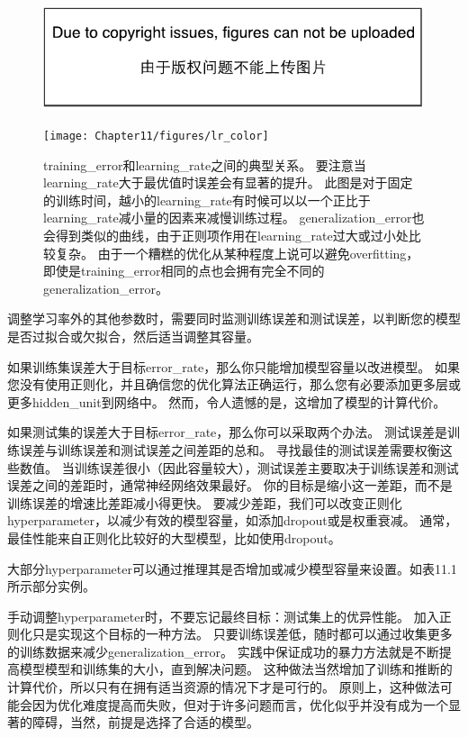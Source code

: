 \begin{figure}[!htb]
\ifOpenSource
\centerline{\includegraphics{figure.pdf}}
\else
\centerline{\texttt{[image: Chapter11/figures/lr\_color]}}
\fi
\caption{\gls{training_error}和\gls{learning_rate}之间的典型关系。
要注意当\gls{learning_rate}大于最优值时误差会有显著的提升。
此图是对于固定的训练时间，越小的\gls{learning_rate}有时候可以以一个正比于\gls{learning_rate}减小量的因素来减慢训练过程。
\gls{generalization_error}也会得到类似的曲线，由于正则项作用在\gls{learning_rate}过大或过小处比较复杂。
由于一个糟糕的优化从某种程度上说可以避免\gls{overfitting}，即使是\gls{training_error}相同的点也会拥有完全不同的\gls{generalization_error}。}
\label{fig:chap11_lr}
\end{figure}

调整学习率外的其他参数时，需要同时监测训练误差和测试误差，以判断您的模型是否过拟合或欠拟合，然后适当调整其容量。

如果训练集误差大于目标\gls{error_rate}，那么你只能增加模型容量以改进模型。
如果您没有使用正则化，并且确信您的优化算法正确运行，那么您有必要添加更多层或更多\gls{hidden_unit}到网络中。
然而，令人遗憾的是，这增加了模型的计算代价。


如果测试集的误差大于目标\gls{error_rate}，那么你可以采取两个办法。
测试误差是训练误差与训练误差和测试误差之间差距的总和。
寻找最佳的测试误差需要权衡这些数值。
当训练误差很小（因此容量较大），测试误差主要取决于训练误差和测试误差之间的差距时，通常神经网络效果最好。
你的目标是缩小这一差距，而不是训练误差的增速比差距减小得更快。
要减少差距，我们可以改变正则化\gls{hyperparameter}，以减少有效的模型容量，如添加\gls{dropout}或是权重衰减。
通常，最佳性能来自正则化比较好的大型模型，比如使用\gls{dropout}。

大部分\gls{hyperparameter}可以通过推理其是否增加或减少模型容量来设置。如表11.1所示部分实例。

手动调整\gls{hyperparameter}时，不要忘记最终目标：测试集上的优异性能。
加入正则化只是实现这个目标的一种方法。
只要训练误差低，随时都可以通过收集更多的训练数据来减少\gls{generalization_error}。
实践中保证成功的暴力方法就是不断提高模型模型和训练集的大小，直到解决问题。
这种做法当然增加了训练和推断的计算代价，所以只有在拥有适当资源的情况下才是可行的。
原则上，这种做法可能会因为优化难度提高而失败，但对于许多问题而言，优化似乎并没有成为一个显著的障碍，当然，前提是选择了合适的模型。

